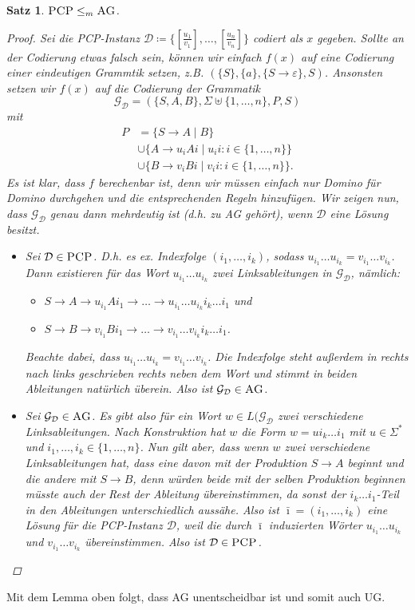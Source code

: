 \documentclass[11pt, a4paper]{article}
\theoremstyle{definition}
\theoremstyle{plain}
\newtheorem*{theorem*}{Satz}
\begin{document}
\begin{theorem*}
	$\textsc{PCP} \leq_m \textsc{AG}$.
	\begin{proof}
		Sei die \textsc{PCP}-Instanz $\mathcal{D} \coloneqq \lbrace [\frac{u_1}{v_1}], \ldots, [\frac{u_n}{v_n}] \rbrace$ codiert als $x$ gegeben. Sollte an der Codierung etwas falsch sein, können wir einfach $f(x)$ auf eine Codierung einer eindeutigen Grammtik setzen, z.B. $(\{S\}, \{a\}, \{S \to \varepsilon\}, S)$. Ansonsten setzen wir $f(x)$ auf die Codierung der Grammatik
		$$
			\mathcal{G}_\mathcal{D} = (\{S, A, B\}, \Sigma \uplus \{1, \ldots, n\}, P, S)
		$$
		mit 
		\begin{align*}
			P &= \{S \to A \mid B\}\\
			&\cup \{A \to u_i A i \mid u_i i : i \in \{1, \ldots, n\}\}\\
			&\cup \{B \to v_i B i \mid v_i i : i \in \{1, \ldots, n\}\}.
		\end{align*}
		Es ist klar, dass $f$ berechenbar ist, denn wir müssen einfach nur Domino für Domino durchgehen und die entsprechenden Regeln hinzufügen.
		Wir zeigen nun, dass $\mathcal{G}_\mathcal{D}$ genau dann mehrdeutig ist (d.h. zu \textsc{AG} gehört), wenn $\mathcal{D}$ eine Lösung besitzt.
		\begin{itemize}
			\item Sei $\mathcal{D} \in \textsc{PCP}$. D.h. es ex. Indexfolge $(i_1, \ldots, i_k)$, sodass $u_{i_1} \ldots u_{i_k} = v_{i_1} \ldots v_{i_k}$. Dann existieren für das Wort $u_{i_1} \ldots u_{i_k}$ zwei Linksableitungen in $\mathcal{G}_\mathcal{D}$, nämlich:
				\begin{itemize}
					\item $S \to A \to u_{i_1} A i_1 \to \ldots \to u_{i_1} \ldots u_{i_k} i_k \ldots i_1$ und
					\item $S \to B \to v_{i_1} B i_1 \to \ldots \to v_{i_1} \ldots v_{i_k} i_k \ldots i_1$.
				\end{itemize}
				Beachte dabei, dass $u_{i_1} \ldots u_{i_k} = v_{i_1} \ldots v_{i_k}$. Die Indexfolge steht außerdem in rechts nach links geschrieben rechts neben dem Wort und stimmt in beiden Ableitungen natürlich überein. Also ist $\mathcal{G}_\mathcal{D} \in \textsc{AG}$.
			\item Sei $\mathcal{G}_\mathcal{D} \in \textsc{AG}$. Es gibt also für ein Wort $w \in L(\mathcal{G}_\mathcal{D}$ zwei verschiedene Linksableitungen. Nach Konstruktion hat $w$ die Form $w = u i_k \ldots i_1$ mit $u \in \Sigma^\ast$ und $i_1, \ldots, i_k \in \{1, \ldots, n\}$. Nun gilt aber, dass wenn $w$ zwei verschiedene Linksableitungen hat, dass eine davon mit der Produktion $S \to A$ beginnt und die andere mit $S \to B$, denn würden beide mit der selben Produktion beginnen müsste auch der Rest der Ableitung übereinstimmen, da sonst der $i_k \ldots i_1$-Teil in den Ableitungen unterschiedlich aussähe. Also ist $\bar{\imath} = (i_1, \ldots, i_k)$ eine Lösung für die \textsc{PCP}-Instanz $\mathcal{D}$, weil die durch $\bar{\imath}$ induzierten Wörter $u_{i_1} \ldots u_{i_k}$ und $v_{i_1} \ldots v_{i_k}$ übereinstimmen. Also ist $\mathcal{D} \in \textsc{PCP}$.\qedhere
		\end{itemize}
	\end{proof}
\end{theorem*}
Mit dem Lemma oben folgt, dass \textsc{AG} unentscheidbar ist und somit auch \textsc{UG}.
\end{document}
